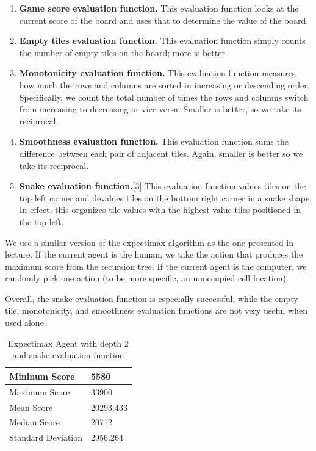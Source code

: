 \documentclass[9pt,twocolumn]{article}
\begin{document}
\begin{enumerate}

\item \textbf{Game score evaluation function.} This evaluation function looks at the current score of the board and uses that to determine the value of the board.
\item \textbf{Empty tiles evaluation function.} This evaluation function simply counts the number of empty tiles on the board; more is better.
\item \textbf{Monotonicity evaluation function.} This evaluation function measures how much the rows and columns are sorted in increasing or descending order. Specifically, we count the total number of times the rows and columns switch from increasing to decreasing or vice versa. Smaller is better, so we take its reciprocal.
\item \textbf{Smoothness evaluation function.} This evaluation function sums the difference between each pair of adjacent tiles. Again, smaller is better so we take its reciprocal.
\item \textbf{Snake evaluation function.}[3] This evaluation function values tiles on the top left corner and devalues tiles on the bottom right corner in a snake shape. In effect, this organizes tile values with the highest value tiles positioned in the top left.

\end{enumerate}

We use a similar version of the expectimax algorithm as the one presented in lecture. If the current agent is the human, we take the action that produces the maximum score from the recursion tree. If the current agent is the computer, we randomly pick one action (to be more specific, an unoccupied cell location).

Overall, the snake evaluation function is especially successful, while the empty tile, monotonicity, and smoothness evaluation functions are not very useful when used alone.

\begin{table}[!htbp]

\centering

\begin{tabular}{|l|l|}
\hline
Mininum Score      & 5580 \\ \hline
Maximum Score      & 33900 \\ \hline
Mean Score         & 20293.433 \\ \hline
Median Score       & 20712 \\ \hline
Standard Deviation & 2956.264 \\ \hline
\end{tabular}

\caption{Expectimax Agent with depth 2 and snake evaluation function}

\end{table}
\end{document}
